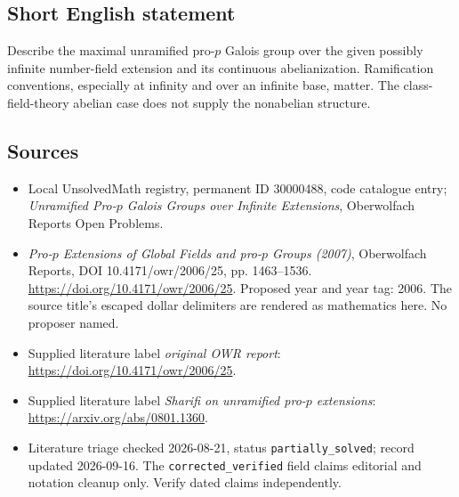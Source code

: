 \documentclass[11pt]{article}
\begin{document}
\subsection{Short English statement}
Describe the maximal unramified pro-\(p\) Galois group over the given possibly infinite number-field extension and its continuous abelianization. Ramification conventions, especially at infinity and over an infinite base, matter. The class-field-theory abelian case does not supply the nonabelian structure.
\subsection{Sources}
\begin{itemize}\item Local UnsolvedMath registry, permanent ID 30000488, code catalogue entry; \emph{Unramified Pro-\(p\) Galois Groups over Infinite Extensions}, Oberwolfach Reports Open Problems.\item \emph{Pro-\(p\) Extensions of Global Fields and pro-\(p\) Groups (2007)}, Oberwolfach Reports, DOI 10.4171/owr/2006/25, pp. 1463--1536. \url{https://doi.org/10.4171/owr/2006/25}. Proposed year and year tag: 2006. The source title's escaped dollar delimiters are rendered as mathematics here. No proposer named.\item Supplied literature label \emph{original OWR report}: \url{https://doi.org/10.4171/owr/2006/25}.\item Supplied literature label \emph{Sharifi on unramified pro-\(p\) extensions}: \url{https://arxiv.org/abs/0801.1360}.\item Literature triage checked 2026-08-21, status \texttt{partially\_solved}; record updated 2026-09-16. The \texttt{corrected\_verified} field claims editorial and notation cleanup only. Verify dated claims independently.\end{itemize}
\end{document}
